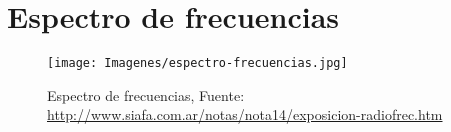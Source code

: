 
\section{Espectro de frecuencias}
\label{sec:comunicaciones.a.bordo.espectro.frecuencias}


\begin{figure}[!htb]
  \centering
 \texttt{[image: Imagenes/espectro-frecuencias.jpg]} 
  \caption{Espectro de frecuencias, {\tiny Fuente: \url{http://www.siafa.com.ar/notas/nota14/exposicion-radiofrec.htm}}}
  \label{fig:espectro.frecuencias}
\end{figure}


